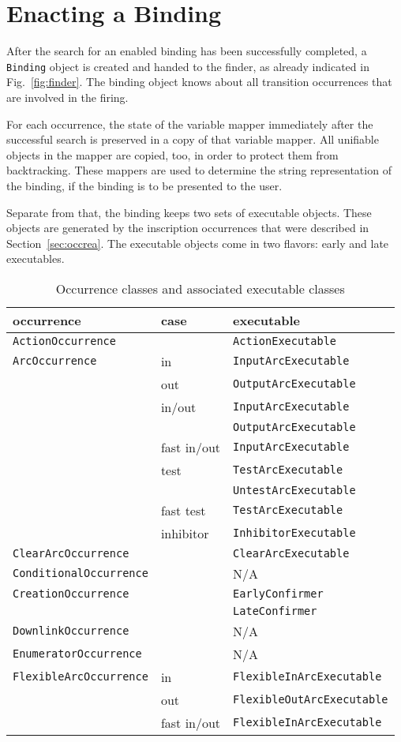 \section{Enacting a Binding}

After the search for an enabled binding has been 
successfully completed, a \texttt{Binding} object is created
and handed to the finder, as already indicated in
Fig.~\ref{fig:finder}. The binding object knows about all
transition occurrences that are involved in the firing.


For each occurrence, the state of the variable mapper
immediately after the successful search is preserved in
a copy of that variable mapper. All unifiable objects
in the mapper are copied, too, in order to protect them 
from backtracking. These mappers are used to determine the
string representation of the binding, if the binding is to be
presented to the user.

Separate from that, the binding keeps two sets of executable
objects. These objects are generated by the inscription
occurrences that were described in Section~\ref{sec:occrea}.
The executable objects come in two flavors: early and
late executables.

\begin{table}[htbp]
  \def\naentry#1{\texttt{#1}&&N/A\\\hline}
  \def\simpleentry#1#2{\texttt{#1}&&\texttt{#2}\\\hline}
  \def\optionentry#1#2#3{\texttt{#1}&#2&\texttt{#3}\\}
  \begin{center}
    \begin{tabular}{lll}
      occurrence & case & executable \\\hline
      \simpleentry{ActionOccurrence}{ActionExecutable}
      \optionentry{ArcOccurrence}{in}{InputArcExecutable}\cline{2-3}
      \optionentry{}{out}{OutputArcExecutable}\cline{2-3}
      \optionentry{}{in/out}{InputArcExecutable}
      \optionentry{}{}{OutputArcExecutable}\cline{2-3}
      \optionentry{}{fast in/out}{InputArcExecutable}\cline{2-3}
      \optionentry{}{test}{TestArcExecutable}
      \optionentry{}{}{UntestArcExecutable}\cline{2-3}
      \optionentry{}{fast test}{TestArcExecutable}\cline{2-3}
      \optionentry{}{inhibitor}{InhibitorExecutable}\hline
      \simpleentry{ClearArcOccurrence}{ClearArcExecutable}
      \naentry{ConditionalOccurrence}
      \optionentry{CreationOccurrence}{}{EarlyConfirmer}
      \optionentry{}{}{LateConfirmer}\hline
      \naentry{DownlinkOccurrence}
      \naentry{EnumeratorOccurrence}
      \optionentry{FlexibleArcOccurrence}{in}
        {FlexibleInArcExecutable}\cline{2-3}
      \optionentry{}{out}{FlexibleOutArcExecutable}\cline{2-3}
      \optionentry{}{fast in/out}{FlexibleInArcExecutable}
    \end{tabular}
  \end{center}
  \caption{Occurrence classes and associated executable classes}
  \label{tab:executables}
\end{table}

